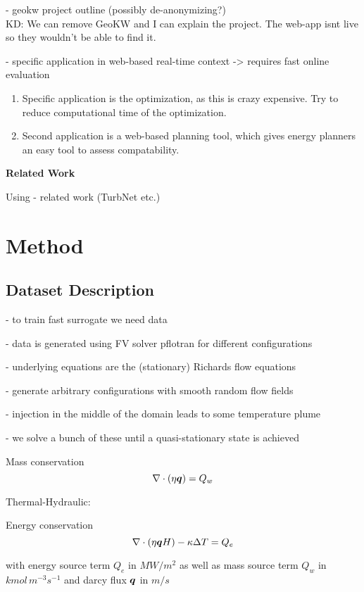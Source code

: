 \documentclass{article} %
\begin{document}
- geokw project outline (possibly de-anonymizing?) \\
KD: We can remove GeoKW and I can explain the project. The web-app isnt live so they wouldn't be able to find it.

- specific application in web-based real-time context -> requires fast online evaluation
\begin{enumerate}
\item Specific application is the optimization, as this is crazy expensive. Try to reduce computational time of the optimization.
\item Second application is a web-based planning tool, which gives energy planners an easy tool to assess compatability.
\end{enumerate}

\textbf{Related Work}

Using 
- related work (TurbNet etc.)

\section{Method}
\label{sec:method}

\subsection*{Dataset Description}
- to train fast surrogate we need data

- data is generated using FV solver pflotran for different configurations

- underlying equations are the (stationary) Richards flow equations

- generate arbitrary configurations with smooth random flow fields

- injection in the middle of the domain leads to some temperature plume

- we solve a bunch of these until a quasi-stationary state is achieved

Mass conservation
\begin{equation}
   \label{eq:mass}
   \nabla \cdot \left(\eta {\bm{q}} \right) = Q_w
\end{equation}

Thermal-Hydraulic:

Energy conservation
\begin{equation}
   \label{eq:energy}
   \nabla \cdot \left(\eta {\bm{q}} H\right) - \kappa \Delta T = Q_e
\end{equation}

with energy source term $Q_e$ in $MW/m^2$ as well as mass source term $Q_w$ in $kmol\, m^{-3} s^{-1}$ and darcy flux ${\bm{q}}$ in $m/s$
\end{document}
